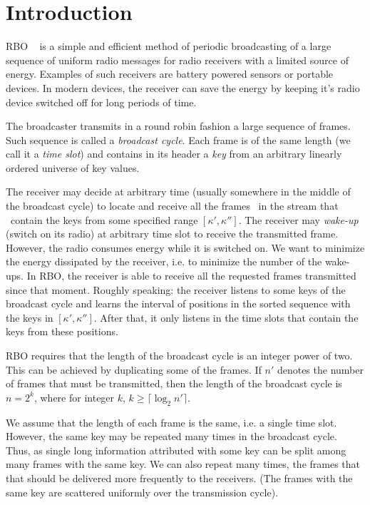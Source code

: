 \documentclass{article}
\newcommand{\tmem}[1]{{\em #1\/}}
\begin{document}
\section{Introduction}

RBO \ {\cite{DBLP:journals/corr/abs-1108-5095}} is a simple and efficient
method of periodic broadcasting of a large sequence of uniform radio messages
for radio receivers with a limited source of energy. Examples of such
receivers are battery powered sensors or portable devices. In modern devices,
the receiver can save the energy by keeping it's radio device switched off for
long periods of time.

The broadcaster transmits in a round robin fashion a large sequence of frames.
Such sequence is called a {\tmem{broadcast cycle}}. Each frame is of the same
length (we call it a {\tmem{time slot}}) and contains in its header a
{\tmem{key}} from an arbitrary linearly ordered universe of key values.

The receiver may decide at arbitrary time (usually somewhere in the middle of
the broadcast cycle) to locate and receive all the frames \ in the stream that
\ contain the keys from some specified range $[\kappa', \kappa'']$. The
receiver may {\tmem{wake-up}} (switch on its radio) at arbitrary time slot to
receive the transmitted frame. However, the radio consumes energy while it is
switched on. We want to minimize the energy dissipated by the receiver, i.e.
to minimize the number of the wake-ups. In RBO, the receiver is able to
receive all the requested frames transmitted since that moment. Roughly
speaking: the receiver listens to some keys of the broadcast cycle and learns
the interval of positions in the sorted sequence with the keys in $[\kappa',
\kappa'']$. After that, it only listens in the time slots that contain the
keys from these positions.

RBO requires that the length of the broadcast cycle is an integer power of
two. This can be achieved by duplicating some of the frames. If $n'$ denotes
the number of frames that must be transmitted, then the length of the
broadcast cycle is $n = 2^k$, where for integer $k$, $k \geq \lceil \log_2 n' \rceil$.

We assume that the length of each frame is the same, i.e. a single time slot.
However, the same key may be repeated many times in the broadcast cycle. Thus,
as single long information attributed with some key can be split among many
frames with the same key. We can also repeat many times, the frames that that
should be delivered more frequently to the receivers. (The frames with the
same key are scattered uniformly over the transmission cycle).
\end{document}
